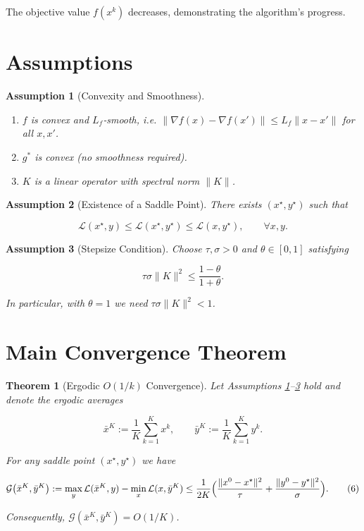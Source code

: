 \documentclass{article}
\newtheorem{theorem}{Theorem}
\newtheorem{assumption}{Assumption}
\newcommand{\gap}{\mathcal{G}}
\begin{document}
The objective value $f(x^{k})$ decreases, demonstrating the algorithm’s progress.

\newpage
\section*{Assumptions}
\begin{assumption}[Convexity and Smoothness]\label{as:convex}
\begin{enumerate}
    \item $f$ is convex and $L_{f}$‑smooth, i.e. $\|\nabla f(x)-\nabla f(x')\|\le L_{f}\|x-x'\|$ for all $x,x'$.
    \item $g^{*}$ is convex (no smoothness required).
    \item $K$ is a linear operator with spectral norm $\|K\|$.
\end{enumerate}
\end{assumption}
\begin{assumption}[Existence of a Saddle Point]\label{as:saddle}
There exists $(x^{\star},y^{\star})$ such that  

\[
\mathcal{L}(x^{\star},y)\le\mathcal{L}(x^{\star},y^{\star})\le\mathcal{L}(x,y^{\star}),\qquad\forall x,y.
\tag{4}
\]
\end{assumption}
\begin{assumption}[Stepsize Condition]\label{as:steps}
Choose $\tau,\sigma>0$ and $\theta\in[0,1]$ satisfying  

\[
\tau\sigma\|K\|^{2}\le\frac{1-\theta}{1+\theta}.
\tag{5}
\]

In particular, with $\theta=1$ we need $\tau\sigma\|K\|^{2}<1$.
\end{assumption}

\section*{Main Convergence Theorem}
\begin{theorem}[Ergodic $O(1/k)$ Convergence]\label{thm:ergodic}
Let Assumptions \ref{as:convex}–\ref{as:steps} hold and denote the ergodic averages  

\[
\bar{x}^{K}:=\frac{1}{K}\sum_{k=1}^{K}x^{k},\qquad 
\bar{y}^{K}:=\frac{1}{K}\sum_{k=1}^{K}y^{k}.
\]

For any saddle point $(x^{\star},y^{\star})$ we have  

\[
\gap\bigl(\bar{x}^{K},\bar{y}^{K}\bigr)
:=\max_{y}\mathcal{L}(\bar{x}^{K},y)-\min_{x}\mathcal{L}(x,\bar{y}^{K})
\le \frac{1}{2K}\Bigl(
\frac{\|x^{0}-x^{\star}\|^{2}}{\tau}
+\frac{\|y^{0}-y^{\star}\|^{2}}{\sigma}
\Bigr).
\tag{6}
\]

Consequently, $\gap(\bar{x}^{K},\bar{y}^{K})=O(1/K)$.
\end{theorem}
\end{document}
